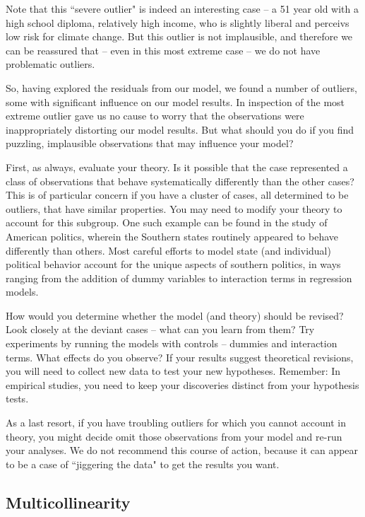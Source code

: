 \documentclass[11pt,openany]{book}
\begin{document}
Note that this ``severe outlier" is indeed an interesting case -- a 51 year old with a high school diploma, relatively high income, who is slightly liberal and perceivs low risk for climate change. But this outlier is not implausible, and therefore we can be reassured that -- even in this most extreme case -- we do not have problematic outliers.

So, having explored the residuals from our model, we found a number of outliers, some with  significant influence on our model results. In inspection of the most extreme outlier gave us no cause to worry that the observations were inappropriately distorting our model results. But what should you do if you find puzzling, implausible observations that may  influence your model?

First, as always, evaluate your theory. Is it possible that the case represented a class of observations that behave systematically differently than the other cases? This is of particular concern if you have a cluster of cases, all determined to be outliers, that have similar properties. You may need to modify your theory to account for this subgroup. One such example can be found in the study of American politics, wherein the Southern states routinely appeared to behave differently than others. Most careful efforts to model state (and individual) political behavior account for the unique aspects of southern politics, in ways ranging from the addition of dummy variables to interaction terms in regression models.

How would you determine whether the model (and theory) should be revised? Look closely at the deviant cases -- what can you learn from them? Try experiments by running the models with controls -- dummies and interaction terms. What effects do you observe? If your results suggest theoretical revisions, you will need to collect new data to test your new hypotheses. Remember: In empirical studies, you need to keep your discoveries distinct from your hypothesis tests.

As a last resort, if you have troubling outliers for which you cannot account in theory, you might decide omit those observations from your model and re-run your analyses. We do not recommend this course of action, because it can  appear to be a case of ``jiggering the data" to get the results you want. 

\subsection{Multicollinearity} 
\end{document}
